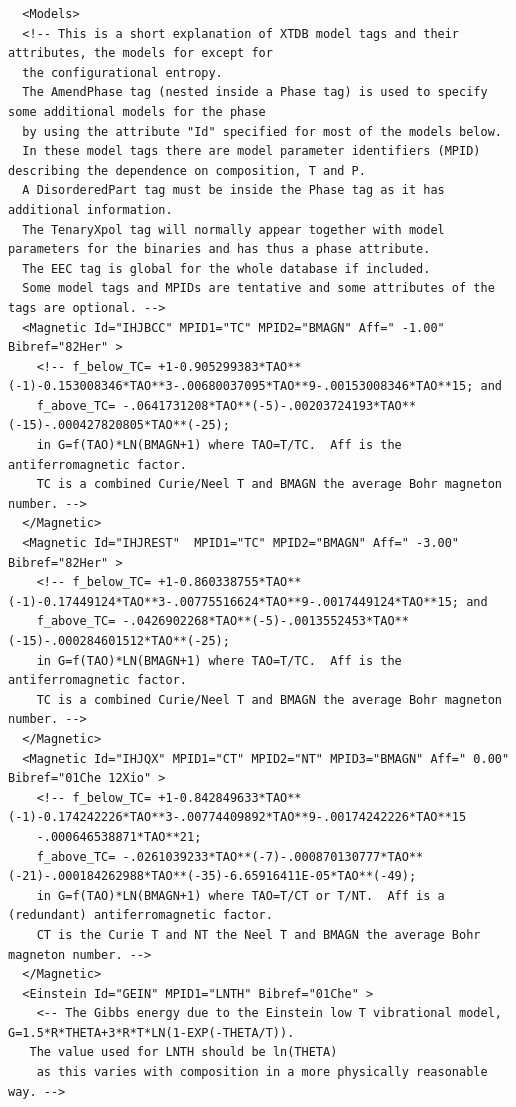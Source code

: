 \documentclass{article}
\begin{document}
\begin{appendices}
{\small
\begin{verbatim}
  <Models>
  <!-- This is a short explanation of XTDB model tags and their attributes, the models for except for
  the configurational entropy.
  The AmendPhase tag (nested inside a Phase tag) is used to specify some additional models for the phase
  by using the attribute "Id" specified for most of the models below.
  In these model tags there are model parameter identifiers (MPID) describing the dependence on composition, T and P.
  A DisorderedPart tag must be inside the Phase tag as it has additional information.
  The TenaryXpol tag will normally appear together with model parameters for the binaries and has thus a phase attribute.
  The EEC tag is global for the whole database if included.
  Some model tags and MPIDs are tentative and some attributes of the tags are optional. -->
  <Magnetic Id="IHJBCC" MPID1="TC" MPID2="BMAGN" Aff=" -1.00" Bibref="82Her" > 
    <!-- f_below_TC= +1-0.905299383*TAO**(-1)-0.153008346*TAO**3-.00680037095*TAO**9-.00153008346*TAO**15; and
    f_above_TC= -.0641731208*TAO**(-5)-.00203724193*TAO**(-15)-.000427820805*TAO**(-25); 
    in G=f(TAO)*LN(BMAGN+1) where TAO=T/TC.  Aff is the antiferromagnetic factor.
    TC is a combined Curie/Neel T and BMAGN the average Bohr magneton number. -->
  </Magnetic>
  <Magnetic Id="IHJREST"  MPID1="TC" MPID2="BMAGN" Aff=" -3.00" Bibref="82Her" > 
    <!-- f_below_TC= +1-0.860338755*TAO**(-1)-0.17449124*TAO**3-.00775516624*TAO**9-.0017449124*TAO**15; and 
    f_above_TC= -.0426902268*TAO**(-5)-.0013552453*TAO**(-15)-.000284601512*TAO**(-25); 
    in G=f(TAO)*LN(BMAGN+1) where TAO=T/TC.  Aff is the antiferromagnetic factor.
    TC is a combined Curie/Neel T and BMAGN the average Bohr magneton number. -->
  </Magnetic>
  <Magnetic Id="IHJQX" MPID1="CT" MPID2="NT" MPID3="BMAGN" Aff=" 0.00" Bibref="01Che 12Xio" > 
    <!-- f_below_TC= +1-0.842849633*TAO**(-1)-0.174242226*TAO**3-.00774409892*TAO**9-.00174242226*TAO**15
    -.000646538871*TAO**21;
    f_above_TC= -.0261039233*TAO**(-7)-.000870130777*TAO**(-21)-.000184262988*TAO**(-35)-6.65916411E-05*TAO**(-49);
    in G=f(TAO)*LN(BMAGN+1) where TAO=T/CT or T/NT.  Aff is a (redundant) antiferromagnetic factor.
    CT is the Curie T and NT the Neel T and BMAGN the average Bohr magneton number. -->
  </Magnetic>
  <Einstein Id="GEIN" MPID1="LNTH" Bibref="01Che" > 
    <-- The Gibbs energy due to the Einstein low T vibrational model, G=1.5*R*THETA+3*R*T*LN(1-EXP(-THETA/T)).
   The value used for LNTH should be ln(THETA)
    as this varies with composition in a more physically reasonable way. -->

\end{verbatim}}
\end{appendices}
\end{document}

